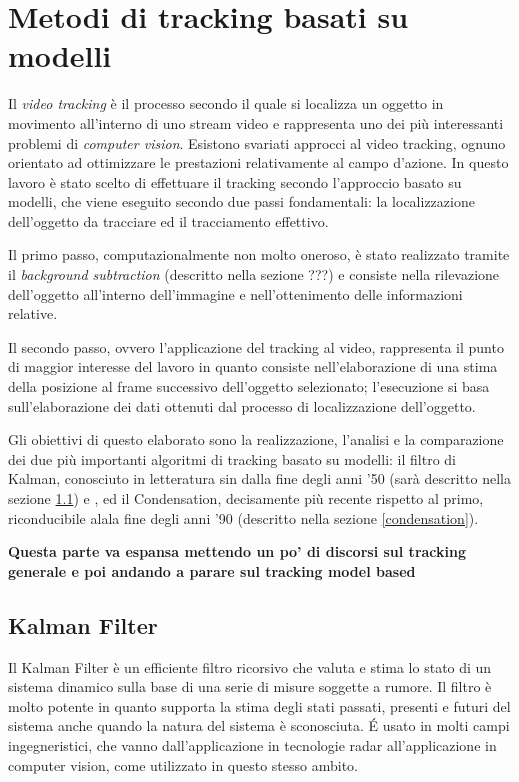 \section{Metodi di tracking basati su modelli} \label{modelTracking}
Il \textit{video tracking} è il processo secondo il quale si localizza un oggetto in movimento all'interno di uno stream video e rappresenta uno dei più interessanti problemi di \textit{computer vision}. Esistono svariati approcci al video tracking, ognuno orientato ad ottimizzare le prestazioni relativamente al campo d'azione. In questo lavoro è stato scelto di effettuare il tracking secondo l'approccio basato su modelli, che viene eseguito secondo due passi fondamentali: la localizzazione dell'oggetto da tracciare ed il tracciamento effettivo.

Il primo passo, computazionalmente non molto oneroso, è stato realizzato tramite il \textit{background subtraction} (descritto nella sezione ???) e consiste nella rilevazione dell'oggetto all'interno dell'immagine e nell'ottenimento delle informazioni relative.

Il secondo passo, ovvero l'applicazione del tracking al video, rappresenta il punto di maggior interesse del lavoro in quanto consiste nell'elaborazione di una stima della posizione al frame successivo dell'oggetto selezionato; l'esecuzione si basa sull'elaborazione dei dati ottenuti dal processo di localizzazione dell'oggetto.

Gli obiettivi di questo elaborato sono la realizzazione, l'analisi e la comparazione dei due più importanti algoritmi di tracking basato su modelli: il filtro di Kalman, conosciuto in letteratura sin dalla fine degli anni '50 (sarà descritto nella sezione \ref{kalman}) e , ed il Condensation, decisamente più recente rispetto al primo, riconducibile alala fine degli anni '90 (descritto nella sezione \ref{condensation}).

\textbf{Questa parte va espansa mettendo un po' di discorsi sul tracking generale e poi andando a parare sul tracking model based}

\subsection{Kalman Filter}\label{kalman}
Il Kalman Filter\cite{kalman-intro} è un efficiente filtro ricorsivo che valuta e stima lo stato di un sistema dinamico sulla base di una serie di misure soggette a rumore. Il filtro è molto potente in quanto supporta la stima degli stati passati, presenti e futuri del sistema anche quando la natura del sistema è sconosciuta. \'E usato in molti campi ingegneristici, che vanno dall'applicazione in tecnologie radar all'applicazione in computer vision, come utilizzato in questo stesso ambito.
